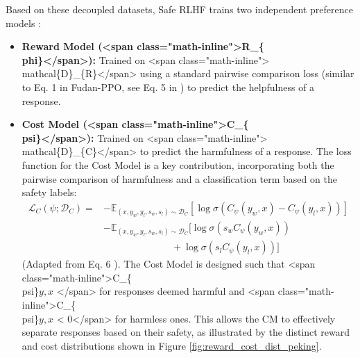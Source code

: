 \documentclass[10pt,journal,compsoc]{IEEEtran} %
\begin{document}
Based on these decoupled datasets, Safe RLHF trains two independent preference models \cite{Dai2023SafeRLHF}:
\begin{itemize}
    \item \textbf{Reward Model (<span class="math-inline">R\_\{\\phi\}</span>):} Trained on <span class="math-inline">\\mathcal\{D\}\_\{R\}</span> using a standard pairwise comparison loss (similar to Eq. 1 in Fudan-PPO, see Eq. 5 in \cite{Dai2023SafeRLHF}) to predict the helpfulness of a response.
    \item \textbf{Cost Model (<span class="math-inline">C\_\{\\psi\}</span>):} Trained on <span class="math-inline">\\mathcal\{D\}\_\{C\}</span> to predict the harmfulness of a response. The loss function for the Cost Model is a key contribution, incorporating both the pairwise comparison of harmfulness and a classification term based on the safety labels:
    \begin{align*}
    \mathcal{L}_{C}(\psi;\mathcal{D}_{C}) = &-\mathbb{E}_{(x,y_w,y_l,s_w,s_l)\sim\mathcal{D}_{C}}[\log\sigma(C_{\psi}(y_w,x)-C_{\psi}(y_l,x))] \\
                         &-\mathbb{E}_{(x,y_w,y_l,s_w,s_l)\sim\mathcal{D}_{C}}[\log\sigma(s_w C_{\psi}(y_w,x)) \\
                         & \qquad \qquad \qquad \quad + \log\sigma(s_l C_{\psi}(y_l,x))]
    \end{align*}
    (Adapted from Eq. 6 \cite{Dai2023SafeRLHF}). The Cost Model is designed such that <span class="math-inline">C\_\{\\psi\}\(y,x\) </span> for responses deemed harmful and <span class="math-inline">C\_\{\\psi\}\(y,x\) < 0</span> for harmless ones. This allows the CM to effectively separate responses based on their safety, as illustrated by the distinct reward and cost distributions shown in Figure \ref{fig:reward_cost_dist_peking}.
\end{itemize}

\end{document}
